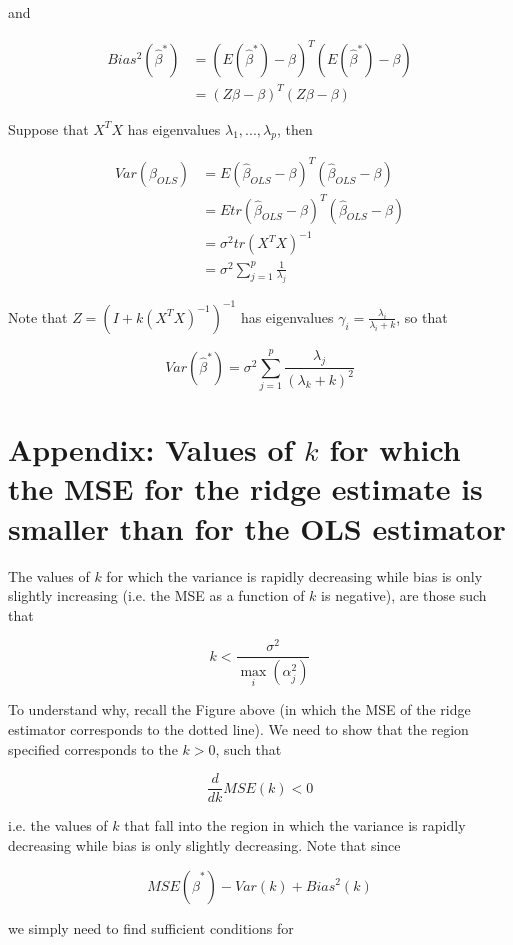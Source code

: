 and

\begin{align*}
Bias^2\left(\hat{\beta}^*\right) &= \left(E(\hat{\beta}^*) - \beta \right)^T\left(E(\hat{\beta}^*) - \beta \right)\\
& = (Z \beta - \beta)^T (Z \beta - \beta)
\end{align*}


Suppose that $X^TX$ has eigenvalues $\lambda_1, ..., \lambda_p$, then


\begin{align*}
Var\left(\hat{\beta}_{OLS}\right) &= E\left(\hat{\beta}_{OLS} - \beta\right)^T\left(\hat{\beta}_{OLS} - \beta\right)\\
& = Etr\left(\hat{\beta}_{OLS} - \beta\right)^T\left(\hat{\beta}_{OLS} - \beta\right)\\
& = \sigma^2 tr(X^TX)^{-1}\\
& = \sigma^2 \sum_{j=1}^p \frac{1}{\lambda_j}
\end{align*}


Note that $Z = \left(I + k(X^TX)^{-1}\right)^{-1}$ has eigenvalues $\gamma_i = \frac{\lambda_i}{\lambda_i + k}$, so that

$$Var\left(\hat{\beta}^*\right) = \sigma^2 \sum_{j=1}^p \frac{\lambda_j}{(\lambda_k + k)^2}$$


\section{Appendix: Values of $k$ for which the MSE for the ridge estimate is smaller than for the OLS estimator}

The values of $k$ for which the variance is rapidly decreasing while bias is only slightly increasing (i.e. the MSE as a function of $k$ is negative), are those such that

$$k < \frac{\sigma^2}{\max_i(\alpha_j^2)}$$

To understand why, recall the Figure above (in which the MSE of the ridge estimator corresponds to the dotted line). We need to show that the region specified corresponds to the $k > 0$, such that

$$\frac{d}{dk} MSE(k) < 0$$


i.e. the values of $k$ that fall into the region in which the variance is rapidly decreasing while bias is only slightly decreasing. Note that since

$$MSE\left(\hat{\beta}^*\right) - Var(k) + Bias^2(k)$$

we simply need to find sufficient conditions for

